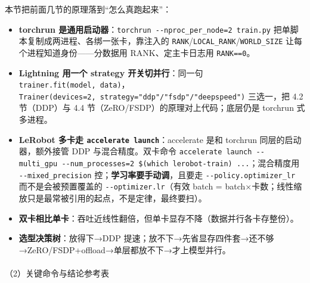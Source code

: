 \documentclass[
  chinese,
]{ctexart}
\makeatletter
\let\oldparagraph\paragraph
\renewcommand{\paragraph}{
    \@ifstar
      \xxxParagraphStar
      \xxxParagraphNoStar
  }
\newcommand{\xxxParagraphStar}[1]{\oldparagraph*{#1}\mbox{}}
\newcommand{\xxxParagraphNoStar}[1]{\oldparagraph{#1}\mbox{}}
\providecommand{\tightlist}{%
  \setlength{\itemsep}{0pt}\setlength{\parskip}{0pt}}
\makeatother
\begin{document}
本节把前面几节的原理落到``怎么真跑起来''：

\begin{itemize}
\tightlist
\item
  \textbf{torchrun
  是通用启动器}：\texttt{torchrun\ -\/-nproc\_per\_node=2\ train.py}
  把单脚本复制成两进程、各绑一张卡，靠注入的
  \texttt{RANK}/\texttt{LOCAL\_RANK}/\texttt{WORLD\_SIZE}
  让每个进程知道身份------分数据用 RANK、定主卡日志用 \texttt{RANK==0}。
\item
  \textbf{Lightning 用一个 strategy 开关切并行}：同一句
  \texttt{trainer.fit(model,\ data)}，\texttt{Trainer(devices=2,\ strategy="ddp"/"fsdp"/"deepspeed")}
  三选一，把 4.2 节（DDP）与 4.4 节（ZeRO/FSDP）的原理对上代码；底层仍是
  torchrun 式多进程。
\item
  \textbf{LeRobot 多卡走 \texttt{accelerate\ launch}}：accelerate 是和
  torchrun 同层的启动器，额外接管 DDP 与混合精度。双卡命令
  \texttt{accelerate\ launch\ -\/-multi\_gpu\ -\/-num\_processes=2\ \$(which\ lerobot-train)\ ...}；混合精度用
  \texttt{-\/-mixed\_precision} 控；\textbf{学习率要手动调}，且要走
  \texttt{-\/-policy.optimizer\_lr} 而不是会被预置覆盖的
  \texttt{-\/-optimizer.lr}（有效 batch =
  batch×卡数；线性缩放只是最常被引用的起点，不是定律，最终要扫）。
\item
  \textbf{双卡相比单卡}：吞吐近线性翻倍，但单卡显存不降（数据并行各卡存整份）。
\item
  \textbf{选型决策树}：放得下→DDP
  提速；放不下→先省显存四件套→还不够→ZeRO/FSDP+offload→单层都放不下→才上模型并行。
\end{itemize}

\paragraph{（2）关键命令与结论参考表}\label{ux5173ux952eux547dux4ee4ux4e0eux7ed3ux8bbaux53c2ux8003ux8868}
\end{document}
